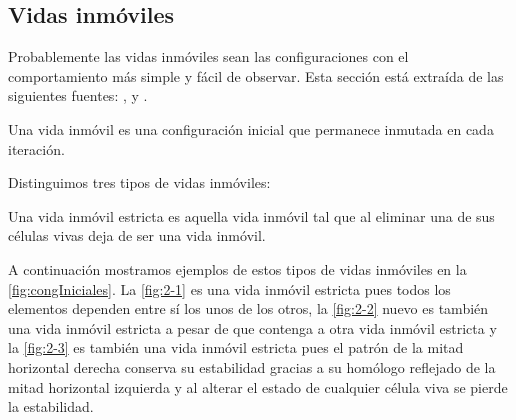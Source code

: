 \documentclass[../proyecto.tex]{memoir}
\begin{document}
\subsection{Vidas inmóviles}
Probablemente las vidas inmóviles sean las configuraciones con el comportamiento más simple y fácil de observar. Esta sección está extraída de las siguientes fuentes: \cite{stillLifeProblem},\cite{stillLifeTheory} y \cite{LikeWikiStill}.


\begin{defi}
Una vida inmóvil es una configuración inicial que permanece inmutada en cada iteración.
\end{defi}

Distinguimos tres tipos de vidas inmóviles:

\begin{defi}
Una vida inmóvil estricta es aquella vida inmóvil tal que al eliminar una de sus células vivas deja de ser una vida inmóvil.
\end{defi}

A continuación mostramos ejemplos de estos tipos de vidas inmóviles en la \autoref{fig:congIniciales}. La \autoref{fig:2-1} es una vida inmóvil estricta pues todos los elementos dependen entre sí los unos de los otros, la \autoref{fig:2-2} nuevo es también una vida inmóvil estricta a pesar de que contenga a otra vida inmóvil estricta y la \autoref{fig:2-3} es también una vida inmóvil estricta pues el patrón de la mitad horizontal derecha conserva su estabilidad gracias a su homólogo reflejado de la mitad horizontal izquierda y al alterar el estado de cualquier célula viva se pierde la estabilidad.
\end{document}
